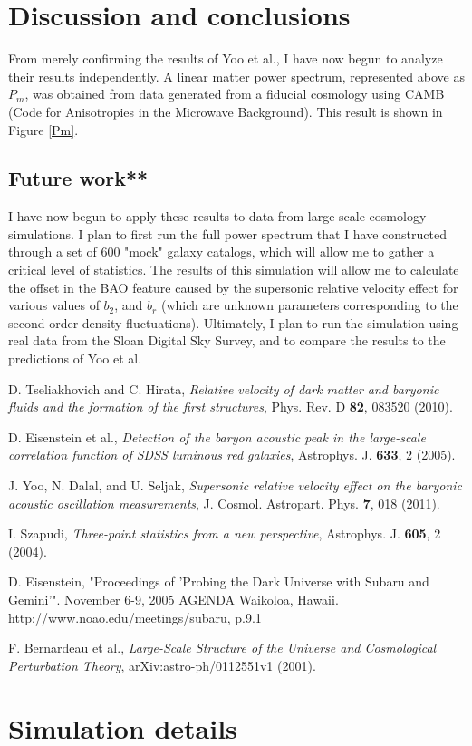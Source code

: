 \documentclass[12pt]{article}
\begin{document}
\section{Discussion and conclusions}

From merely confirming the results of Yoo et al., I have now begun to analyze their results independently. A linear matter power spectrum, represented above as $P_{m}$, was obtained from data generated from a fiducial cosmology using CAMB (Code for Anisotropies in the Microwave Background). This result is shown in Figure \ref{Pm}.

\subsection{Future work**}

I have now begun to apply these results to data from large-scale cosmology simulations. I plan to first run the full power spectrum that I have constructed through a set of 600 "mock" galaxy catalogs, which will allow me to gather a critical level of statistics. The results of this simulation will allow me to calculate the offset in the BAO feature caused by the supersonic relative velocity effect for various values of $b_{2}$, and $b_{r}$ (which are unknown parameters corresponding to the second-order density fluctuations). Ultimately, I plan to run the simulation using real data from the Sloan Digital Sky Survey, and to compare the results to the predictions of Yoo et al.

\begin{thebibliography}{1}

D. Tseliakhovich and C. Hirata, \emph{Relative velocity of dark matter and baryonic fluids and the formation of the first structures}, Phys. Rev. D \textbf{82}, 083520 (2010).

D. Eisenstein et al., \emph{Detection of the baryon acoustic peak in the large-scale correlation function of SDSS luminous red galaxies}, Astrophys. J. \textbf{633}, 2 (2005).

J. Yoo, N. Dalal, and U. Seljak, \emph{Supersonic relative velocity effect on the baryonic acoustic oscillation measurements}, J. Cosmol. Astropart. Phys. \textbf{7}, 018 (2011). 

I. Szapudi, \emph{Three-point statistics from a new perspective}, Astrophys. J. \textbf{605}, 2 (2004).

D. Eisenstein, "Proceedings of 'Probing the Dark Universe with Subaru and Gemini'". November 6-9, 2005 AGENDA Waikoloa, Hawaii. http://www.noao.edu/meetings/subaru, p.9.1

F. Bernardeau et al., \emph{Large-Scale Structure of the Universe and Cosmological Perturbation Theory}, arXiv:astro-ph/0112551v1 (2001).

\end{thebibliography}

\appendix
\section{Simulation details}
\end{document}
